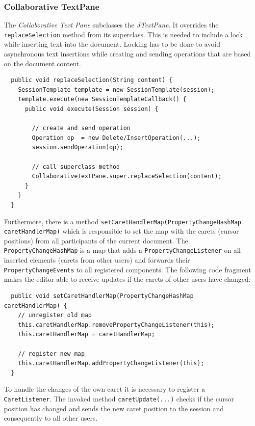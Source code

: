 \subsubsection{Collaborative TextPane}
The \textit{Collaborative Text Pane} subclasses the \textit{JTextPane}. It overrides the \texttt{replaceSelection} method from its superclass. This is needed to include a lock while inserting text into the document. Locking has to be done to avoid asynchronous text insertions while creating and sending operations that are based on the document content.
\begin{verbatim}
  public void replaceSelection(String content) {
    SessionTemplate template = new SessionTemplate(session);
    template.execute(new SessionTemplateCallback() {
      public void execute(Session session) {

        // create and send operation
        Operation op  = new Delete/InsertOperation(...);
        session.sendOperation(op);

        // call superclass method
        CollaborativeTextPane.super.replaceSelection(content);
      }
    }
  }
\end{verbatim}
Furthermore, there is a method \texttt{setCaretHandlerMap(PropertyChangeHashMap caretHandlerMap)} which is responsible to set the map with the carets (cursor positions) from all participants of the current document. The \texttt{PropertyChangeHashMap} is a map that adds a \texttt{PropertyChangeListener} on all inserted elements (carets from other users) and forwards their \texttt{PropertyChangeEvents} to all registered components. The following code fragment makes the editor able to receive updates if the carets of other users have changed:
\begin{verbatim}
  public void setCaretHandlerMap(PropertyChangeHashMap caretHandlerMap) {
    // unregister old map
    this.caretHandlerMap.removePropertyChangeListener(this);
    this.caretHandlerMap = caretHandlerMap;

    // register new map
    this.caretHandlerMap.addPropertyChangeListener(this);
  }
\end{verbatim}
To handle the changes of the own caret it is necessary to register a \texttt{CaretListener}. The invoked method \texttt{caretUpdate(...)} checks if the cursor position has changed and sends the new caret position to the session and consequently to all other users.

